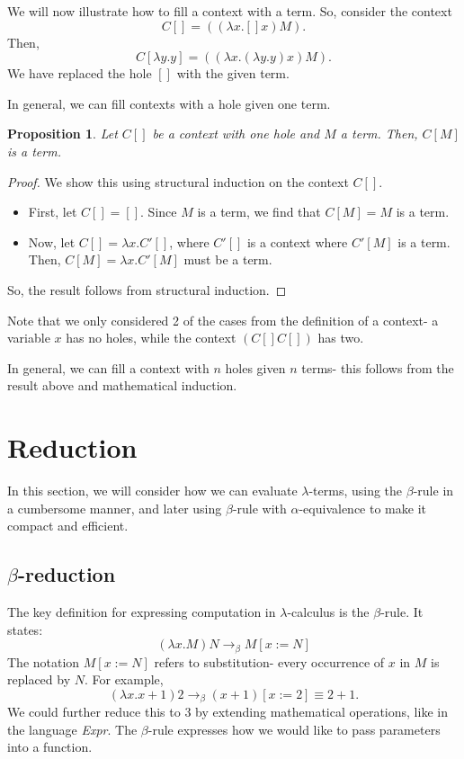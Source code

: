 \documentclass[a4paper, openany]{memoir}
\newtheorem{proposition}{Proposition}[section]
\theoremstyle{definition}
\begin{document}
    We will now illustrate how to fill a context with a term. So, consider the context 
    \[C[] = ((\lambda x. [] x) M).\]
    Then, 
    \[C[\lambda y.y] = ((\lambda x.(\lambda y.y) x) M).\]
    We have replaced the hole $[]$ with the given term.

    In general, we can fill contexts with a hole given one term.
    \begin{proposition}
        Let $C[]$ be a context with one hole and $M$ a term. Then, $C[M]$ is a term.
    \end{proposition}
    \begin{proof}
        We show this using structural induction on the context $C[]$.
        \begin{itemize}
            \item First, let $C[] = []$. Since $M$ is a term, we find that $C[M] = M$ is a term.
            \item Now, let $C[] = \lambda x. C'[]$, where $C'[]$ is a context where $C'[M]$ is a term. Then, $C[M] = \lambda x. C'[M]$ must be a term.
        \end{itemize}
        So, the result follows from structural induction.
    \end{proof}
    \noindent Note that we only considered 2 of the cases from the definition of a context- a variable $x$ has no holes, while the context $(C[] C[])$ has two.
    
    In general, we can fill a context with $n$ holes given $n$ terms- this follows from the result above and mathematical induction.

    \newpage

    \section{Reduction}
    In this section, we will consider how we can evaluate $\lambda$-terms, using the $\beta$-rule in a cumbersome manner, and later using $\beta$-rule with $\alpha$-equivalence to make it compact and efficient.

    \subsection{$\beta$-reduction}
    The key definition for expressing computation in $\lambda$-calculus is the $\beta$-rule. It states:
    \[(\lambda x. M) N \to_\beta M[x := N]\]
    The notation $M[x := N]$ refers to substitution- every occurrence of $x$ in $M$ is replaced by $N$. For example,
    \[(\lambda x. x+1) 2 \to_\beta (x + 1)[x := 2] \equiv 2 + 1.\]
    We could further reduce this to $3$ by extending mathematical operations, like in the language \textit{Expr}. The $\beta$-rule expresses how we would like to pass parameters into a function.
\end{document}
